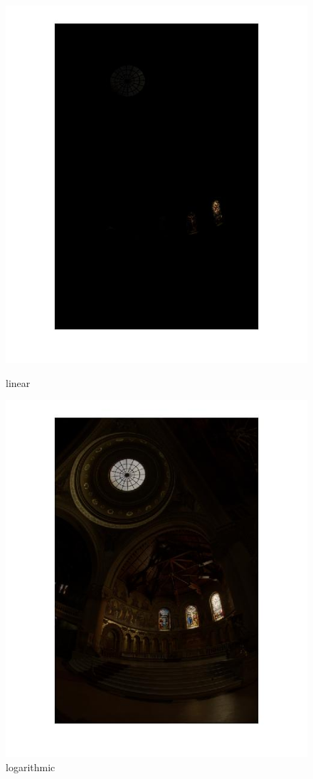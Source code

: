   \begin{figure}[!htb]
  	\includegraphics[width=\linewidth]{images/linearhdr1}
  	\caption{linear}\label{fig:logtonemap}
  	\endminipage\hfill
  	\includegraphics[width=\linewidth]{images/loghdr1}
  	\caption{logarithmic}\label{fig:lineartonemap}
  	\endminipage\hfill
   \end{figure}
      

